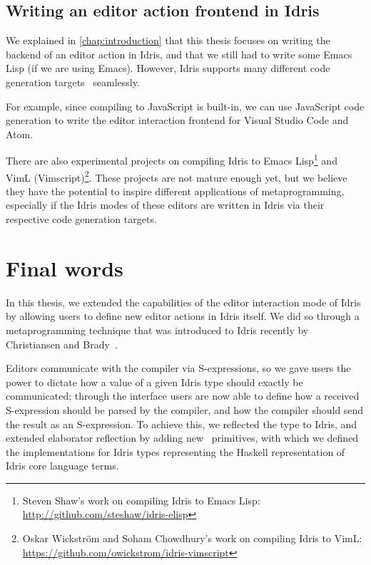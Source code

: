 \subsection{Writing an editor action frontend in Idris}

We explained in \autoref{chap:introduction} that this thesis focuses on writing
the backend of an editor action in Idris, and that we still had to write some
Emacs Lisp (if we are using Emacs). However, Idris supports many different
code generation targets~\cite{idriscodegen} seamlessly.

For example, since compiling to JavaScript is built-in, we can use JavaScript
code generation to write the editor interaction frontend for Visual Studio Code
and Atom.

There are also experimental projects on compiling Idris to Emacs
Lisp\footnote{Steven Shaw's work on compiling Idris to Emacs Lisp:
\url{http://github.com/steshaw/idris-elisp}} and VimL
(Vimscript)\footnote{Oskar Wickstr\"om and Soham Chowdhury's work on
compiling Idris to VimL:
\url{https://github.com/owickstrom/idris-vimscript}}. These projects are not
mature enough yet, but we believe they have the potential to inspire different
applications of metaprogramming, especially if the Idris modes of these editors
are written in Idris via their respective code generation targets.

\section{Final words}

In this thesis, we extended the capabilities of the editor interaction mode of
Idris by allowing users to define new editor actions in Idris itself. We did
so through a metaprogramming technique that was introduced to Idris recently by
Christiansen and Brady~\cite{elabref}.

Editors communicate with the compiler via S-expressions, so we gave users the
power to dictate how a value of a given Idris type should exactly be
communicated; through the  interface users are now able to
define how a received S-expression should be parsed by the compiler, and how
the compiler should send the result as an S-expression. To achieve this, we
reflected the  type to Idris, and extended elaborator reflection
by adding new \Elab\ primitives, with which we defined the 
implementations for Idris types representing the Haskell representation of
Idris core language terms.


